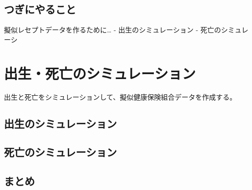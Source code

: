 \documentclass[
]{book}
\begin{document}
\hypertarget{ux3064ux304eux306bux3084ux308bux3053ux3068}{%
\subsection{つぎにやること}\label{ux3064ux304eux306bux3084ux308bux3053ux3068}}

擬似レセプトデータを作るために\ldots{}
- 出生のシミュレーション
- 死亡のシミュレーシ

\hypertarget{ux51faux751fux6b7bux4ea1ux306eux30b7ux30dfux30e5ux30ecux30fcux30b7ux30e7ux30f3}{%
\section{出生・死亡のシミュレーション}\label{ux51faux751fux6b7bux4ea1ux306eux30b7ux30dfux30e5ux30ecux30fcux30b7ux30e7ux30f3}}

出生と死亡をシミュレーションして、擬似健康保険組合データを作成する。

\hypertarget{ux51faux751fux306eux30b7ux30dfux30e5ux30ecux30fcux30b7ux30e7ux30f3}{%
\subsection{出生のシミュレーション}\label{ux51faux751fux306eux30b7ux30dfux30e5ux30ecux30fcux30b7ux30e7ux30f3}}

\hypertarget{ux6b7bux4ea1ux306eux30b7ux30dfux30e5ux30ecux30fcux30b7ux30e7ux30f3}{%
\subsection{死亡のシミュレーション}\label{ux6b7bux4ea1ux306eux30b7ux30dfux30e5ux30ecux30fcux30b7ux30e7ux30f3}}

\hypertarget{ux307eux3068ux3081}{%
\subsection{まとめ}\label{ux307eux3068ux3081}}

  
\end{document}
